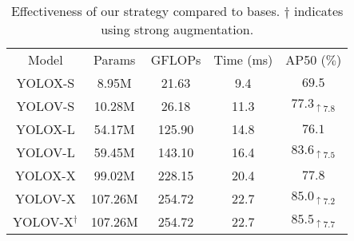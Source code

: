 \documentclass[letterpaper]{article} \usepackage{aaai23}  \usepackage{times}  \usepackage{helvet}  \usepackage{courier}  \usepackage[hyphens]{url}  \usepackage{graphicx} \urlstyle{rm} \def\UrlFont{\rm}  \usepackage{natbib}  \usepackage{caption} \usepackage{xcolor}
\begin{document}
\setlength{\tabcolsep}{4pt}
\begin{table}[t]
\begin{center}
\begin{tabular}{c|cccc}
\hline\noalign{\smallskip}
Model&Params&GFLOPs&Time (ms)&AP50 ($\%$)\\
\noalign{\smallskip}
\hline
\noalign{\smallskip}


YOLOX-S & 8.95M & 21.63 & 9.4 &$69.5$\\
YOLOV-S & 10.28M & 26.18 & 11.3 & $77.3_{\uparrow 7.8 }$\\
YOLOX-L & 54.17M & 125.90 & 14.8 &  $76.1$\\
YOLOV-L & 59.45M & 143.10 & 16.4 &  $83.6_{\uparrow 7.5}$ \\
YOLOX-X & 99.02M & 228.15 & 20.4 & $77.8$\\
YOLOV-X & 107.26M & 254.72 & 22.7 & $85.0_{\uparrow 7.2 }$\\
YOLOV-X$^\dagger$ & 107.26M & 254.72 & 22.7 & $85.5_{\uparrow 7.7 }$\\

\hline
\end{tabular}
\end{center}
\caption{Effectiveness of our strategy compared to bases. $\dagger$ indicates using strong augmentation.}
\label{table:effectiveness of diff model}
\end{table}
\setlength{\tabcolsep}{1.4pt}
\end{document}
